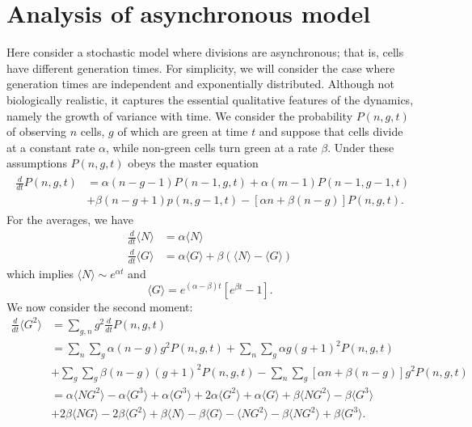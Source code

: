 \documentclass{article}
\begin{document}
\section{Analysis of asynchronous model}\label{app:async}

Here consider a stochastic model where divisions are asynchronous; that is, cells have different generation times. For simplicity, we will consider the case where generation times are independent and exponentially distributed. Although not biologically realistic, it captures the essential qualitative features of the dynamics, namely the growth of variance with time. We consider the probability $P(n,g,t)$ of observing $n$ cells, $g$ of which are green at time $t$ and suppose that cells divide at a constant rate $\alpha$, while non-green cells turn green at a rate $\beta$. Under these assumptions $P(n,g,t)$ obeys the master equation 
\begin{align}
\begin{split}
\frac{d}{dt}P(n,g,t) &= \alpha(n-g-1)P(n-1,g,t) + \alpha (m-1)P(n-1,g-1,t) \\
&+ \beta (n-g+1)p(n,g-1,t)- \left[\alpha n + \beta (n-g)  \right]P(n,g,t).
\end{split}
\end{align}
For the averages, we have
\begin{align}
\frac{d}{dt}\langle N  \rangle &= \alpha\langle N  \rangle \\
\frac{d}{dt}\langle G  \rangle &= \alpha\langle G  \rangle + \beta(\langle N\rangle - \langle  G\rangle)  
\end{align}
which implies $\langle N  \rangle  \sim e^{\alpha t}$ and 
\begin{equation}
\langle G \rangle = e^{(\alpha-\beta)t} \left[e^{\beta t} - 1\right].
\end{equation}
We now consider the second moment:
\begin{align}
\frac{d}{dt}\langle  G^2\rangle  &= \sum_{g,n} g^2 \frac{d}{dt}P(n,g,t)\\
&= \sum_n \sum_g \alpha (n-g) g^2 P(n,g,t) + \sum_n \sum_g \alpha g (g+1)^2 P(n,g,t)\\
&+ \sum_g \sum_g \beta (n-g)(g+1)^2 P(n,g,t) - \sum_n\sum_g \left[\alpha n + \beta(n-g) \right] g^2 P(n,g,t)\\
&= \alpha \langle  N G^2\rangle - \alpha \langle G^3 \rangle  + \alpha \langle  G^3\rangle 
  + 2 \alpha \langle  G^2\rangle  + \alpha \langle G \rangle  + \beta \langle N G^2 \rangle  - \beta \langle G^3 \rangle \\
&+ 2\beta \langle N G \rangle  - 2 \beta \langle G^2 \rangle  + \beta \langle  N\rangle  - \beta \langle  G\rangle 
 - \langle N G^2 \rangle - \beta \langle  N G^2\rangle  + \beta \langle G^3\rangle. 
\end{align}
\end{document}
